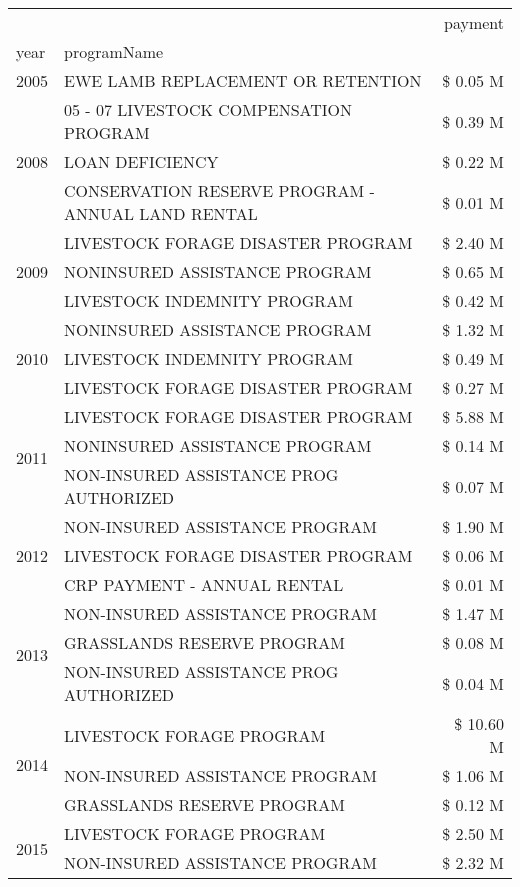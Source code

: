 \begin{tabular}{llr}
\toprule
 &  & payment \\
year & programName &  \\
\midrule
2005 & EWE LAMB REPLACEMENT OR RETENTION & \$ 0.05 M \\
\cline{1-3}
\multirow[t]{3}{*}{2008} & 05 - 07 LIVESTOCK COMPENSATION PROGRAM & \$ 0.39 M \\
 & LOAN DEFICIENCY & \$ 0.22 M \\
 & CONSERVATION RESERVE PROGRAM - ANNUAL LAND RENTAL & \$ 0.01 M \\
\cline{1-3}
\multirow[t]{3}{*}{2009} & LIVESTOCK FORAGE DISASTER  PROGRAM & \$ 2.40 M \\
 & NONINSURED ASSISTANCE PROGRAM & \$ 0.65 M \\
 & LIVESTOCK INDEMNITY PROGRAM & \$ 0.42 M \\
\cline{1-3}
\multirow[t]{3}{*}{2010} & NONINSURED ASSISTANCE PROGRAM & \$ 1.32 M \\
 & LIVESTOCK INDEMNITY PROGRAM & \$ 0.49 M \\
 & LIVESTOCK FORAGE DISASTER PROGRAM & \$ 0.27 M \\
\cline{1-3}
\multirow[t]{3}{*}{2011} & LIVESTOCK FORAGE DISASTER PROGRAM & \$ 5.88 M \\
 & NONINSURED ASSISTANCE PROGRAM & \$ 0.14 M \\
 & NON-INSURED ASSISTANCE PROG AUTHORIZED & \$ 0.07 M \\
\cline{1-3}
\multirow[t]{3}{*}{2012} & NON-INSURED ASSISTANCE PROGRAM & \$ 1.90 M \\
 & LIVESTOCK FORAGE DISASTER PROGRAM & \$ 0.06 M \\
 & CRP PAYMENT - ANNUAL RENTAL & \$ 0.01 M \\
\cline{1-3}
\multirow[t]{3}{*}{2013} & NON-INSURED ASSISTANCE PROGRAM & \$ 1.47 M \\
 & GRASSLANDS RESERVE PROGRAM & \$ 0.08 M \\
 & NON-INSURED ASSISTANCE PROG AUTHORIZED & \$ 0.04 M \\
\cline{1-3}
\multirow[t]{3}{*}{2014} & LIVESTOCK FORAGE PROGRAM & \$ 10.60 M \\
 & NON-INSURED ASSISTANCE PROGRAM & \$ 1.06 M \\
 & GRASSLANDS RESERVE PROGRAM & \$ 0.12 M \\
\cline{1-3}
\multirow[t]{3}{*}{2015} & LIVESTOCK FORAGE PROGRAM & \$ 2.50 M \\
 & NON-INSURED ASSISTANCE PROGRAM & \$ 2.32 M \\

\end{tabular}
